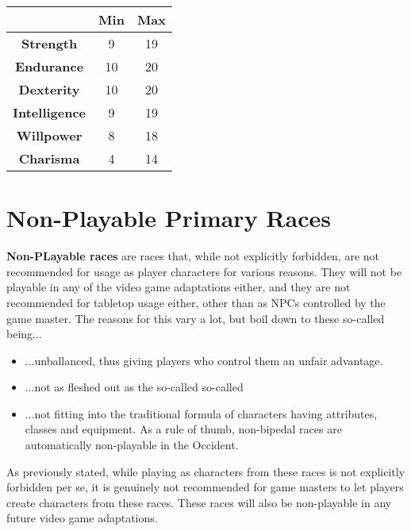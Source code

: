 \documentclass[openany,10pt,a4paper]{book}
\begin{document}
\begin{tabular}{|c|c|c|}
\hline
 & \textbf{Min} & \textbf{Max} \\ \hline
\textbf{Strength} & 9 & 19 \\ \hline
\textbf{Endurance} & 10 & 20 \\ \hline
\textbf{Dexterity} & 10 & 20 \\ \hline
\textbf{Intelligence} & 9 & 19 \\ \hline
\textbf{Willpower} & 8 & 18 \\ \hline
\textbf{Charisma} & 4 & 14 \\ \hline
\end{tabular}\newline
{}\newpage
\chapter{Non-Playable Primary Races}
\textbf{Non-PLayable races} are races that, while not explicitly forbidden, are not recommended for usage as player characters for various reasons. They will not be playable in any of the video game adaptations either, and they are not recommended for tabletop usage either, other than as NPCs controlled by the game master. The reasons for this vary a lot, but boil down to these so-called  being...
\begin{itemize}
	\item ...unballanced, thus giving players who control them an unfair advantage.
	\item ...not as fleshed out as the so-called so-called 
	\item ...not fitting into the traditional formula of characters having attributes, classes and equipment. As a rule of thumb, non-bipedal races are automatically non-playable in the Occident.
\end{itemize}
As previously stated, while playing as characters from these races is not explicitly forbidden per se, it is genuinely not recommended for game masters to let players create characters from these races. These races will also be non-playable in any future video game adaptations.
\end{document}
